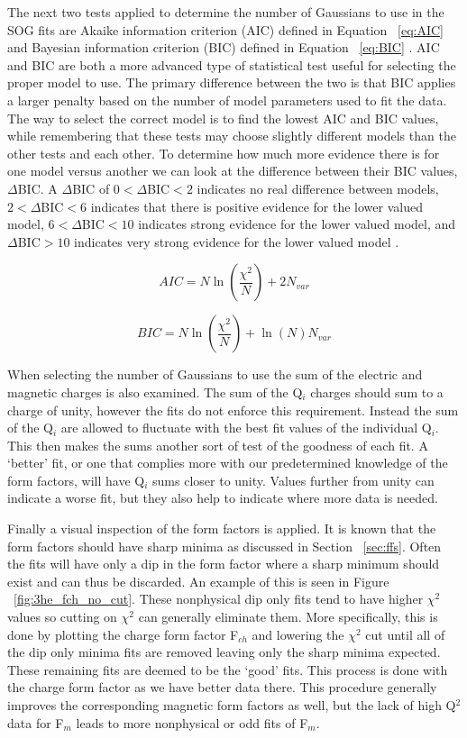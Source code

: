 The next two tests applied to determine the number of Gaussians to use in the SOG fits are Akaike information criterion (AIC) defined in Equation ~\ref{eq:AIC} \cite{Article:AIC} and Bayesian information criterion (BIC) defined in Equation ~\ref{eq:BIC} \cite{Article:BIC}. AIC and BIC are both a more advanced type of statistical test useful for selecting the proper model to use. The primary difference between the two is that BIC applies a larger penalty based on the number of model parameters used to fit the data. The way to select the correct model is to find the lowest AIC and BIC values, while remembering that these tests may choose slightly different models than the other tests and each other. To determine how much more evidence there is for one model versus another we can look at the difference between their BIC values, $\Delta$BIC. A $\Delta$BIC of $0<\Delta$BIC$<2$ indicates no real difference between models, $2<\Delta$BIC$<6$ indicates that there is positive evidence for the lower valued model, $6<\Delta$BIC$<10$ indicates strong evidence for the lower valued model, and $\Delta$BIC$>10$ indicates very strong evidence for the lower valued model \cite{Article:Delta_BIC}.

\begin{equation} \label{eq:AIC}
	AIC = N \ln\left( \frac{\chi^2}{N} \right) + 2 N_{var}
\end{equation}

\begin{equation} \label{eq:BIC}
	BIC = N \ln\left( \frac{\chi^2}{N} \right) +  \ln\left( N \right) N_{var}
\end{equation}

When selecting the number of Gaussians to use the sum of the electric and magnetic charges is also examined. The sum of the Q$_i$ charges should sum to a charge of unity, however the fits do not enforce this requirement. Instead the sum of the Q$_i$ are allowed to fluctuate with the best fit values of the individual Q$_i$. This then makes the sums another sort of test of the goodness of each fit. A `better' fit, or one that complies more with our predetermined knowledge of the form factors, will have Q$_i$ sums closer to unity. Values further from unity can indicate a worse fit, but they also help to indicate where more data is needed.

Finally a visual inspection of the form factors is applied. It is known that the form factors should have sharp minima as discussed in Section ~\ref{sec:ffs}. Often the fits will have only a dip in the form factor where a sharp minimum should exist and can thus be discarded. An example of this is seen in Figure ~\ref{fig:3he_fch_no_cut}. These nonphysical dip only fits tend to have higher $\chi^2$ values so cutting on $\chi^2$ can generally eliminate them. More specifically, this is done by plotting the charge form factor F$_{ch}$ and lowering the $\chi^2$ cut until all of the dip only minima fits are removed leaving only the sharp minima expected. These remaining fits are deemed to be the `good' fits. This process is done with the charge form factor as we have better data there. This procedure generally improves the corresponding magnetic form factors as well, but the lack of high Q$^2$ data for F$_m$ leads to more nonphysical or odd fits of F$_m$.

